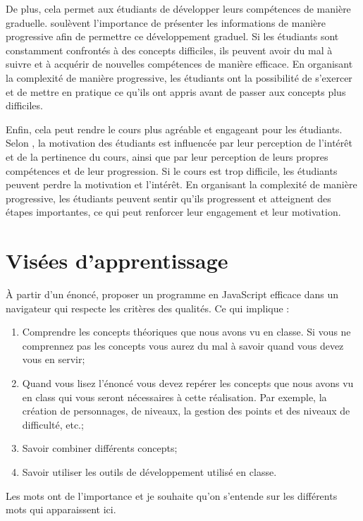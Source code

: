 De plus, cela permet aux étudiants de développer leurs compétences de manière graduelle. \citet{gagne1974principles} soulèvent l'importance de présenter les informations de manière progressive afin de permettre ce développement graduel. Si les étudiants sont constamment confrontés à des concepts difficiles, ils peuvent avoir du mal à suivre et à acquérir de nouvelles compétences de manière efficace. En organisant la complexité de manière progressive, les étudiants ont la possibilité de s'exercer et de mettre en pratique ce qu'ils ont appris avant de passer aux concepts plus difficiles.

Enfin, cela peut rendre le cours plus agréable et engageant pour les étudiants. Selon \citet{keller1987development}, la motivation des étudiants est influencée par leur perception de l'intérêt et de la pertinence du cours, ainsi que par leur perception de leurs propres compétences et de leur progression. Si le cours est trop difficile, les étudiants peuvent perdre la motivation et l'intérêt. En organisant la complexité de manière progressive, les étudiants peuvent sentir qu'ils progressent et atteignent des étapes importantes, ce qui peut renforcer leur engagement et leur motivation.

\clearpage
\section{Visées d’apprentissage}

À partir d'un énoncé, proposer un programme en JavaScript efficace dans un navigateur qui respecte les critères des qualités. Ce qui implique :
\begin{enumerate}
    \item Comprendre les concepts théoriques que nous avons vu en classe. Si vous ne comprennez pas les concepts vous aurez du mal à savoir quand vous devez vous en servir;
    \item Quand vous lisez l'énoncé vous devez repérer les concepts que nous avons vu en class qui vous seront nécessaires à cette réalisation. Par exemple, la création de personnages, de niveaux, la gestion des points et des niveaux de difficulté, etc.;
    \item Savoir combiner différents concepts;
    \item Savoir utiliser les outils de développement utilisé en classe.\\
\end{enumerate}

Les mots ont de l'importance et je souhaite qu'on s'entende sur les différents mots qui apparaissent ici.

